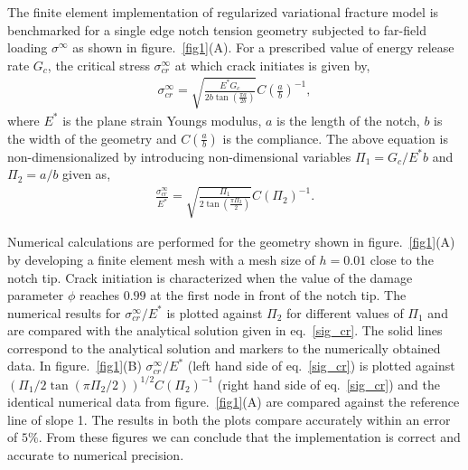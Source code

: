 \documentclass[12pt,letterpaper]{article}
\let\Pi\varPi
\begin{document}
The finite element implementation of regularized variational fracture model is benchmarked for a single edge notch tension geometry subjected to far-field loading $\sigma^{\infty}$ as shown in figure.~\ref{fig1}(A). For a prescribed value of energy release rate $G_c$, the critical stress $\sigma_{cr}^{\infty}$ at which crack initiates is given by,
\begin{align*}
\sigma_{cr}^{\infty} = \sqrt{\frac{E^* G_c}{2 b \tan{\left(\frac{\pi a}{2 b} \right)} }} C\left(\frac{a}{b}\right)^{-1},
\end{align*} 
where $E^*$ is the plane strain Youngs modulus, $a$ is the length of the notch, $b$ is the width of the geometry and $C\left(\frac{a}{b}\right)$ is the compliance. The above equation is non-dimensionalized by introducing non-dimensional variables $\Pi_\mathit{1}= G_c/E^* b$ and $\Pi_\mathit{2} = a/b$ given as,
\begin{align}\label{sig_cr}
\frac{\sigma_{cr}^{\infty}}{E^*} = \sqrt{\frac{\Pi_\mathit{1}}{2  \tan{\left(\frac{\pi \Pi_\mathit{2}}{2} \right)} }} C\left(\Pi_\mathit{2}\right)^{-1}.
\end{align}

Numerical calculations are performed for the geometry shown in figure.~\ref{fig1}(A) by developing a finite element mesh with a mesh size of $h = 0.01$ close to the notch tip. Crack initiation is characterized when the value of the damage parameter $\phi$ reaches $0.99$ at the first node in front of the notch tip. The numerical results for $\sigma_{cr}^{\infty}/E^*$ is plotted against $\Pi_\mathit{2}$ for different values of $\Pi_\mathit{1}$ and are compared with the analytical solution given in eq.~\ref{sig_cr}. The solid lines correspond to the analytical solution and markers to the numerically obtained data. In figure.~\ref{fig1}(B) $\sigma_{cr}^{\infty}/E^*$ (left hand side of eq.~\ref{sig_cr}) is plotted against $\left(\Pi_\mathit{1}/2 \tan{\left(\pi \Pi_\mathit{2}/2 \right)}\right)^{1/2} C \left(\Pi_\mathit{2} \right)^{-1}$ (right hand side of eq.~\ref{sig_cr}) and the identical numerical data from figure.~\ref{fig1}(A) are compared against the reference line of slope 1. The results in both the plots compare accurately within an error of $5\%$. From these figures we can conclude that the implementation is correct and accurate to numerical precision.
\end{document}

